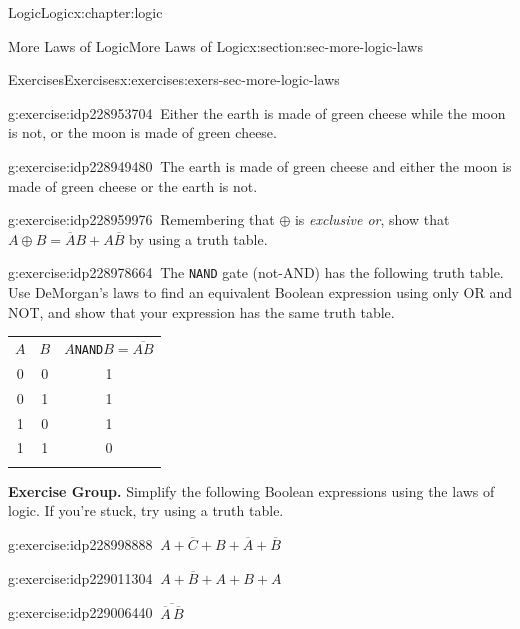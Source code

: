 \documentclass[twoside,10pt,]{book}
\newcommand{\tabularfont}{\relax}
\newcommand{\mono}[1]{\texttt{#1}}
\numberwithin{equation}{section}
\newcommand{\hrulethick} {\noalign{\hrule height 0.11em}}
\begin{document}
\begin{chapterptx}{Logic}{}{Logic}{}{}{x:chapter:logic}
\begin{sectionptx}{More Laws of Logic}{}{More Laws of Logic}{}{}{x:section:sec-more-logic-laws}
\begin{exercises-subsection}{Exercises}{}{Exercises}{}{}{x:exercises:exers-sec-more-logic-laws}
\begin{exercisegroup}
\begin{divisionexerciseeg}{23}{}{}{g:exercise:idp228953704}%
\(\ \)Either the earth is made of green cheese while the moon is not, or the moon is made of green cheese.\end{divisionexerciseeg}%
\begin{divisionexerciseeg}{24}{}{}{g:exercise:idp228949480}%
\(\ \)The earth is made of green cheese and either the moon is made of green cheese or the earth is not.\end{divisionexerciseeg}%
\begin{divisionexerciseeg}{25}{}{}{g:exercise:idp228959976}%
\(\ \)Remembering that \({\oplus}{}\) is \emph{exclusive or}, show that \(A{\oplus}{}B = \overline{A}{}B + A\overline{B}{}\) by using a truth table.\end{divisionexerciseeg}%
\begin{divisionexerciseeg}{26}{}{}{g:exercise:idp228978664}%
\(\ \)The \mono{NAND} gate (not-AND) has the following truth table.  Use DeMorgan's laws to find an equivalent Boolean expression using only OR and NOT, and show that your expression has the same truth table. \begin{center}%
{\tabularfont%
\begin{tabular}{ccc}\hrulethick
\(A\)&\(B\)&\(A\)\mono{NAND}\(B=\overline{AB}\)\tabularnewline[0pt]
0&0&1\tabularnewline[0pt]
0&1&1\tabularnewline[0pt]
1&0&1\tabularnewline[0pt]
1&1&0\tabularnewline\hrulethick
\end{tabular}
}%
\end{center}%
\end{divisionexerciseeg}%
\end{exercisegroup}
\par\medskip\noindent
\par\medskip\noindent%
\textbf{Exercise Group.}\space\space%
Simplify the following Boolean expressions using the laws of logic.  If you're stuck, try using a truth table.\begin{exercisegroup}
\begin{divisionexerciseeg}{27}{}{}{g:exercise:idp228998888}%
\(\ A + \overline{C}{} + B + \overline{A}{} + \overline{B}{}\)\end{divisionexerciseeg}%
\begin{divisionexerciseeg}{28}{}{}{g:exercise:idp229011304}%
\(\ A + \overline{B}{} + A + B + A\)\end{divisionexerciseeg}%
\begin{divisionexerciseeg}{29}{}{}{g:exercise:idp229006440}%
\(\ \overline{\overline{A}{}\,\overline{B}{}}\)\end{divisionexerciseeg}%

\end{exercisegroup}
\end{exercises-subsection}
\end{sectionptx}
\end{chapterptx}
\end{document}
